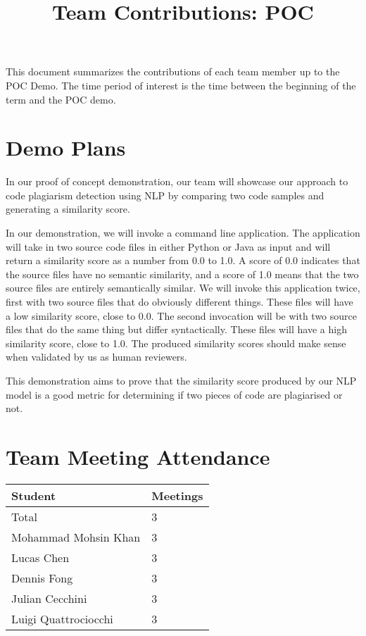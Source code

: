 \documentclass{article}
\title{Team Contributions: POC\\\progname}
\author{\authname}
\date{}
\begin{document}
\maketitle

This document summarizes the contributions of each team member up to the POC
Demo.  The time period of interest is the time between the beginning of the term
and the POC demo.

\section{Demo Plans}

In our proof of concept demonstration, our team will showcase our approach
to code plagiarism detection using NLP by comparing two code samples and generating a similarity score.

In our demonstration, we will invoke a command line application. The application will take
in two source code files in either Python or Java as input and will return a similarity score
as a number from 0.0 to 1.0. A score of 0.0 indicates that the source files have no semantic similarity,
and a score of 1.0 means that the two source files are entirely semantically similar.
We will invoke this application twice, first with two source files that do obviously different things.
These files will have a low similarity score, close to 0.0. The second invocation will be with two
source files that do the same thing but differ syntactically. These files will have a high similarity score,
close to 1.0. The produced similarity scores should make sense when validated by us as human reviewers.

This demonstration aims to prove that the similarity score produced by our NLP model is a good metric
for determining if two pieces of code are plagiarised or not.


\section{Team Meeting Attendance}


\begin{table}[H]
\centering
\begin{tabular}{ll}
\toprule
\textbf{Student} & \textbf{Meetings}\\
\midrule
Total & 3\\
Mohammad Mohsin Khan & 3\\
Lucas Chen & 3\\
Dennis Fong & 3\\
Julian Cecchini & 3\\
Luigi Quattrociocchi & 3\\
\bottomrule
\end{tabular}
\end{table}
\end{document}
